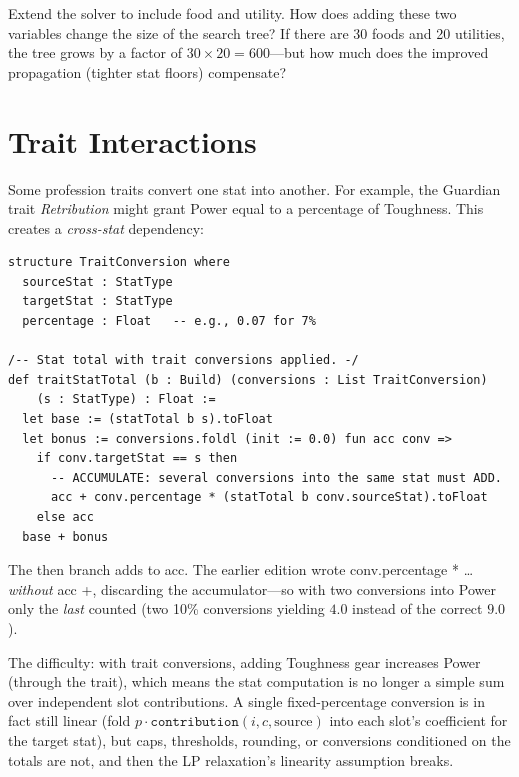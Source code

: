 \documentclass[11pt, a4paper, oneside]{book}
\newcommand{\li}[1]{{\ttfamily\small\color{deepblue}#1}}
\begin{document}
\begin{exercisebox}
Extend the solver to include food and utility.  How does adding these two
variables change the size of the search tree?  If there are 30 foods and
20 utilities, the tree grows by a factor of $30 \times 20 = 600$---but
how much does the improved propagation (tighter stat floors) compensate?
\end{exercisebox}

\section{Trait Interactions}

Some profession traits convert one stat into another.  For example, the
Guardian trait \emph{Retribution} might grant Power equal to a percentage
of Toughness.  This creates a \emph{cross-stat} dependency:

\begin{leanbox}[title={Lean 4 --- Trait-Modified Stat Computation}]
\begin{verbatim}
structure TraitConversion where
  sourceStat : StatType
  targetStat : StatType
  percentage : Float   -- e.g., 0.07 for 7%

/-- Stat total with trait conversions applied. -/
def traitStatTotal (b : Build) (conversions : List TraitConversion)
    (s : StatType) : Float :=
  let base := (statTotal b s).toFloat
  let bonus := conversions.foldl (init := 0.0) fun acc conv =>
    if conv.targetStat == s then
      -- ACCUMULATE: several conversions into the same stat must ADD.
      acc + conv.percentage * (statTotal b conv.sourceStat).toFloat
    else acc
  base + bonus
\end{verbatim}
\end{leanbox}

The \li{then} branch adds to \li{acc}.  The earlier edition wrote
\li{conv.percentage * \ldots} \emph{without} \li{acc +}, discarding the
accumulator---so with two conversions into Power only the \emph{last} counted
(two 10\% conversions yielding $4.0$ instead of the correct $9.0$).

The difficulty: with trait conversions, adding Toughness gear increases Power
(through the trait), which means the stat computation is no longer a simple
sum over independent slot contributions.  A single fixed-percentage conversion
is in fact still linear (fold $p \cdot \texttt{contribution}(i,c,\text{source})$
into each slot's coefficient for the target stat), but caps, thresholds,
rounding, or conversions conditioned on the totals are not, and then the LP
relaxation's linearity assumption breaks.
\end{document}
